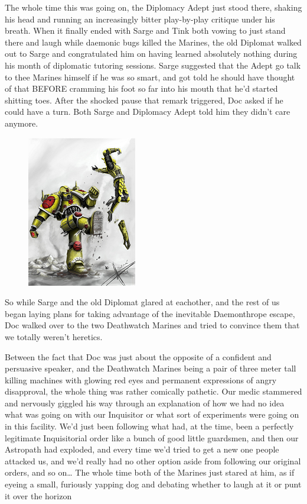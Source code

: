The whole time this was going on, the Diplomacy Adept just stood there, shaking his head and running an increasingly bitter play-by-play critique under his breath. 
When it finally ended with Sarge and Tink both vowing to just stand there and laugh while daemonic bugs killed the Marines, the old Diplomat walked out to Sarge and congratulated him on having learned absolutely nothing during his month of diplomatic tutoring sessions. 
Sarge suggested that the Adept go talk to thee Marines himself if he was so smart, and got told he should have thought of that BEFORE cramming his foot so far into his mouth that he'd started shitting toes. 
After the shocked pause that remark triggered, Doc asked if he could have a turn. 
Both Sarge and Diplomacy Adept told him they didn't care anymore.

\begin{figure}
	\begin{center}
		\includegraphics[width=\figwidth]{pics/16/10.png}
	\end{center}
\end{figure}
So while Sarge and the old Diplomat glared at eachother, and the rest of us began laying plans for taking advantage of the inevitable Daemonthrope escape, Doc walked over to the two Deathwatch Marines and tried to convince them that we totally weren't heretics.

Between the fact that Doc was just about the opposite of a confident and persuasive speaker, and the Deathwatch Marines being a pair of three meter tall killing machines with glowing red eyes and permanent expressions of angry disapproval, the whole thing was rather comically pathetic. 
Our medic stammered and nervously giggled his way through an explanation of how we had no idea what was going on with our Inquisitor or what sort of experiments were going on in this facility. 
We'd just been following what had, at the time, been a perfectly legitimate Inquisitorial order like a bunch of good little guardsmen, and then our Astropath had exploded, and every time we'd tried to get a new one people attacked us, and we'd really had no other option aside from following our original orders, and so on… The whole time both of the Marines just stared at him, as if eyeing a small, furiously yapping dog and debating whether to laugh at it or punt it over the horizon

